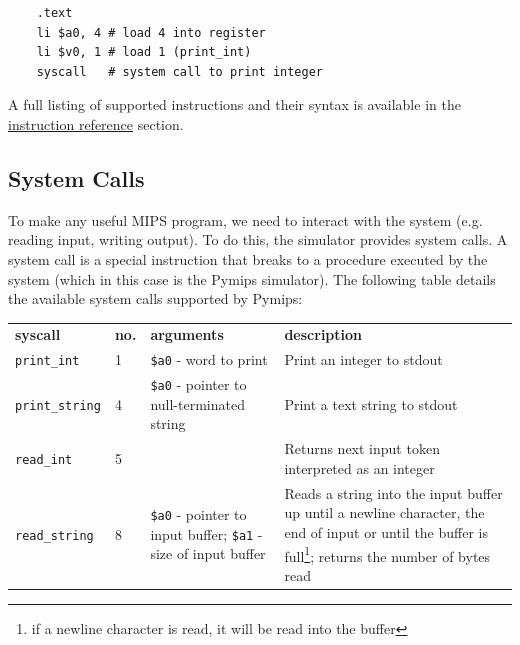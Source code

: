 \documentclass[12pt]{article}
\begin{document}
\begin{lstlisting}
    .text
    li $a0, 4 # load 4 into register
    li $v0, 1 # load 1 (print_int)
    syscall   # system call to print integer
\end{lstlisting}

A full listing of supported instructions and their syntax is available in the
     \hyperref[sec:iref]{instruction reference} section.

\subsection{System Calls}

To make any useful MIPS program, we need to interact with the system
     (e.g. reading input, writing output). To do this, the simulator provides
     system calls. A system call is a special instruction that breaks to a
     procedure executed by the system (which in this case is the Pymips
     simulator). The following table details the available system calls
     supported by Pymips:\\

\begin{tabular}{p{} || p{} | p{} | p{}}
    \textbf{syscall} & \textbf{no.} & \textbf{arguments} &
     \textbf{description} \\ \hhline{=#=|=|=}

    \texttt{print\_int} & 1 & \texttt{\$a0} - word to print & Print an integer
     to stdout \\ \hline

    \texttt{print\_string} & 4 & \texttt{\$a0} - pointer to null-terminated
     string & Print a text string to stdout \\ \hline

    \texttt{read\_int} & 5 &  & Returns next input token interpreted as an
     integer \\ \hline

    \texttt{read\_string} & 8 & \texttt{\$a0} - pointer to input buffer;
     \texttt{\$a1} - size of input buffer & Reads a string into the input buffer
     up until a newline character, the end of input or until the buffer is
     full\footnote{if a newline character is read, it will be read into the
     buffer}; returns the number of bytes read \\ \hline
\end{tabular}
\end{document}
